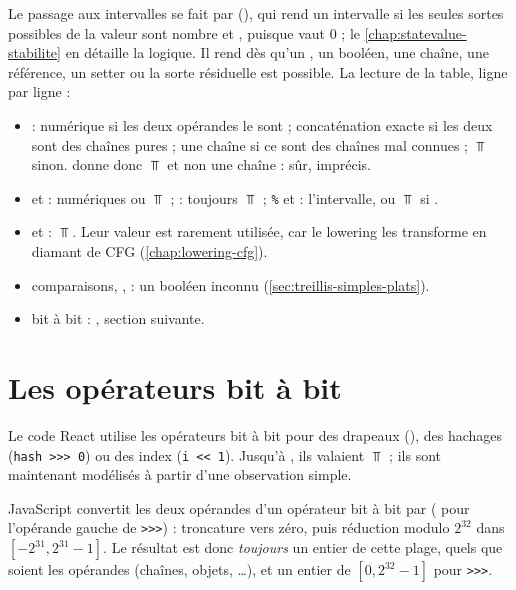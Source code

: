 Le passage aux intervalles se fait par 
(), qui rend un intervalle
si les seules sortes possibles de la valeur sont \og nombre\fg{} et
\og {}\fg{}, puisque  vaut $0$ ; le
\cref{chap:statevalue-stabilite} en détaille la logique. Il rend 
dès qu'un , un booléen, une chaîne, une référence, un setter
ou la sorte résiduelle  est possible. La lecture de la table,
ligne par ligne :
\begin{itemize}
  \item \code{+} : numérique si les deux opérandes le sont ; concaténation
    exacte si les deux sont des chaînes pures ; \og une chaîne\fg{} si ce sont
    des chaînes mal connues ; $\Top$ sinon.  donne donc
    $\Top$ et non une chaîne : sûr, imprécis.
  \item \code{-} et \code{*} : numériques ou $\Top$ ; \code{/} : toujours
    $\Top$ ; \texttt{\%} et \code{**} : l'intervalle, ou $\Top$ si .
  \item \code{&&} et \code{||} : $\Top$. Leur valeur est rarement utilisée,
    car le lowering les transforme en diamant de CFG
    (\cref{chap:lowering-cfg}).
  \item comparaisons, ,  : un booléen inconnu
    (\cref{sec:treillis-simples-plats}).
  \item bit à bit : , section suivante.
\end{itemize}

\section{Les opérateurs bit à bit}
\label{sec:treillis-simples-bitwise}

Le code React utilise les opérateurs bit à bit pour des drapeaux
(), des hachages (\texttt{hash >{}>{}> 0}) ou des index
(\texttt{i <{}< 1}). Jusqu'à , ils valaient $\Top$ ; ils sont
maintenant modélisés à partir d'une observation simple.

\begin{remarque}
  JavaScript convertit les deux opérandes d'un opérateur bit à bit par
   ( pour l'opérande gauche de \texttt{>{}>{}>}) :
  troncature vers zéro, puis réduction modulo $2^{32}$ dans
  $[-2^{31}, 2^{31}-1]$. Le résultat est donc \emph{toujours} un entier de
  cette plage, quels que soient les opérandes (chaînes, objets,
  \dots), et un entier de $[0, 2^{32}-1]$ pour \texttt{>{}>{}>}.
\end{remarque}

